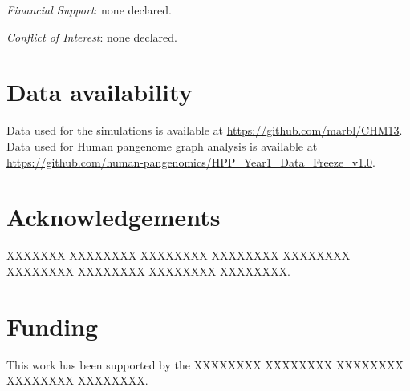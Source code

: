 \documentclass{bioinfo}
\begin{document}
%
%

    \vspace*{+12pt}
    \textit{Financial Support}: none declared.

    \textit{Conflict of Interest}: none declared.
    \vspace*{+12pt}

    \section*{Data availability}

    Data used for the simulations is available at \href{https://github.com/marbl/CHM13}{https://github.com/marbl/CHM13}.
    Data used for Human pangenome graph analysis is available at \href{https://github.com/human-pangenomics/HPP_Year1_Data_Freeze_v1.0}{https://github.com/human-pangenomics/HPP\_Year1\_Data\_Freeze\_v1.0}.

    \section*{Acknowledgements}
    XXXXXXX XXXXXXXX XXXXXXXX XXXXXXXX XXXXXXXX XXXXXXXX XXXXXXXX XXXXXXXX XXXXXXXX.


    \section*{Funding}
    This work has been supported by the XXXXXXXX XXXXXXXX XXXXXXXX XXXXXXXX XXXXXXXX.

%
%
%
%
%
%
%
%
%
\end{document}
